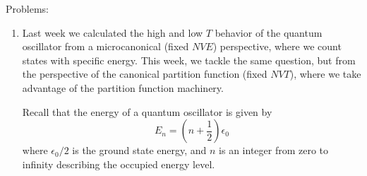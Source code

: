 \documentclass[12pt]{article}
\newenvironment{answer}[2][Solution]{\begin{trivlist}
\item[\hskip \labelsep {\bfseries #1}\hskip \labelsep {\bfseries #2.}]}{\end{trivlist}}
\begin{document}
\begin{description}


\item[Problems:]
\end{description}

\begin{enumerate}


\item Last week we calculated the high and low $T$ behavior of the
  quantum oscillator from a microcanonical (fixed $NVE$) perspective,
  where we count states with specific energy.  This week, we
  tackle the same question, but from the perspective of the canonical
  partition function (fixed $NVT$), where we take advantage of the
  partition function machinery.

Recall that the energy of a quantum oscillator is given by
$$E_n = \left(n+\frac{1}{2}\right) \epsilon_0 $$
where $\epsilon_0/2$ is the ground state energy, and $n$ is an integer
from zero to infinity describing the occupied energy level.


\end{enumerate}
\end{document}
